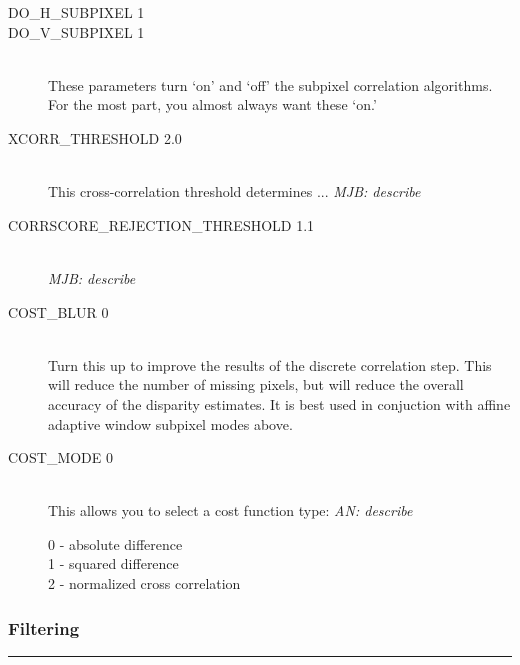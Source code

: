 \begin{description}
\item[DO\_H\_SUBPIXEL 1]
\item[DO\_V\_SUBPIXEL 1] \hfill \\
These parameters turn `on' and `off' the subpixel correlation
algorithms.  For the most part, you almost always want these `on.'

\item[XCORR\_THRESHOLD 2.0] \hfill \\
This cross-correlation threshold determines ... \emph{MJB: describe}

\item[CORRSCORE\_REJECTION\_THRESHOLD 1.1] \hfill \\
\emph{MJB: describe}

\item[COST\_BLUR 0] \hfill \\
Turn this up to improve the results of the discrete
correlation step.  This will reduce the number of 
missing pixels, but will reduce the overall accuracy of 
the disparity estimates.  It is best used in conjuction with 
affine adaptive window subpixel modes above.

\item[COST\_MODE 0] \hfill \\
This allows you to select a cost function type:
\emph{AN: describe}
	\begin{description}
	\item[0 - absolute difference]
	\item[1 - squared difference]
	\item[2 - normalized cross correlation]
	\end{description}

\end{description}

\subsubsection*{Filtering}
\hrule
\bigskip

